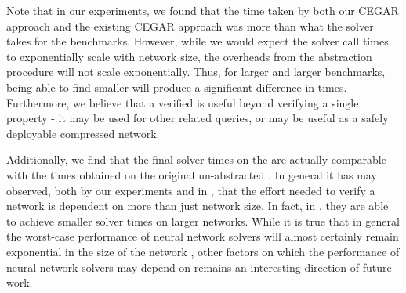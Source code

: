 Note that in our experiments, we found that the time taken by both our CEGAR
approach and the existing CEGAR approach \cite{cegar-nn} was more than what the
\neuralsat solver takes for the \acasxu benchmarks. However, while we would
expect the solver call times to exponentially scale with network size, the
overheads from the abstraction procedure will not scale exponentially. Thus, for
larger and larger benchmarks, being able to find smaller \abs will produce a
significant difference in times. Furthermore, we believe that a verified \abs is
useful beyond verifying a single property - it may be used for other related
queries, or may be useful as a safely deployable compressed network.

Additionally, we find that the final solver times on the \abs are actually
comparable with the times obtained on the original un-abstracted \cnc. In
general it has may observed, both by our experiments and in \cite{cegar-nn},
that the effort needed to verify a network is dependent
on more than just network size. In fact, in \cite{cegar-nn},
they are able to achieve smaller solver times on larger networks. 
While it is true that in general the worst-case performance of neural network
solvers will almost certainly remain exponential in the size of the network
\cite{reluplex}, other factors on which the performance of neural network
solvers may depend on remains an interesting direction of future work. 

